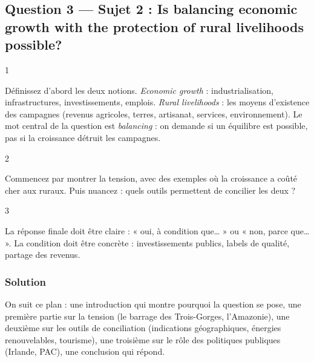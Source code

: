 \documentclass[11pt,a4paper]{article}
\begin{document}
\hypertarget{question-3-sujet-2-is-balancing-economic-growth-with-the-protection-of-rural-livelihoods-possible}{%
\subsection{Question 3 --- Sujet 2 : Is balancing economic growth with the protection of rural livelihoods possible?}\label{question-3-sujet-2-is-balancing-economic-growth-with-the-protection-of-rural-livelihoods-possible}}

\begin{indication}{1}

Définissez d'abord les deux notions. \emph{Economic growth} : industrialisation, infrastructures, investissements, emplois. \emph{Rural livelihoods} : les moyens d'existence des campagnes (revenus agricoles, terres, artisanat, services, environnement). Le mot central de la question est \emph{balancing} : on demande si un équilibre est possible, pas si la croissance détruit les campagnes.

\end{indication}

\begin{indication}{2}

Commencez par montrer la tension, avec des exemples où la croissance a coûté cher aux ruraux. Puis nuancez : quels outils permettent de concilier les deux ?

\end{indication}

\begin{indication}{3}

La réponse finale doit être claire : « oui, à condition que\ldots{} » ou « non, parce que\ldots{} ». La condition doit être concrète : investissements publics, labels de qualité, partage des revenus.

\end{indication}

\hypertarget{solution-2}{%
\subsubsection{Solution}\label{solution-2}}

On suit ce plan : une introduction qui montre pourquoi la question se pose, une première partie sur la tension (le barrage des Trois-Gorges, l'Amazonie), une deuxième sur les outils de conciliation (indications géographiques, énergies renouvelables, tourisme), une troisième sur le rôle des politiques publiques (Irlande, PAC), une conclusion qui répond.
\end{document}
